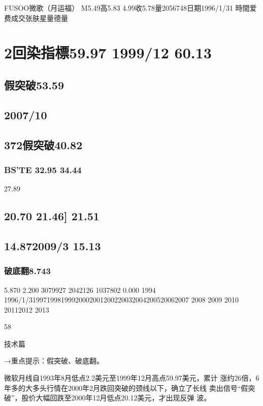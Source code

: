 \documentclass{article}
\begin{document}
FUSOO微歌（月运福） M5.49高5.83 4.99收5.78量2056748日期1996/1/31 時間爱费成交张肤星量德量

\section{2回染指標59.97 1999/12 60.13}

\subsection{假突破53.59}

\subsection{2007/10}

\subsection{372假突破40.82}

\subsubsection{BS'TE 32.95 34.44}

27.89

\subsection{20.70 21.46] 21.51}

\subsection{14.872009/3 15.13}

\subsubsection{破底翻8.743}

5.870 2.200 3079927 2042126 1037802 0.000 1994 1996/1/319971998199920002001200220032004200520062007 2008 2009 2010 20112012 2013

58

\clearpage

技术篇

→重点提示：假突破、破底翻。

微软月线自1993年8月低点2.2美元至1999年12月高点59.97美元，累计 涨约26倍，6年多的大多头行情在2000年2月跌回突破的颈线以下，确立了长线 卖出信号“假突破”，股价大幅回跌至2000年12月低点20.12美元，才出现反弹 波。
\end{document}
